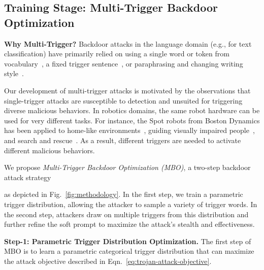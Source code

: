 \documentclass{article}
\begin{document}
\subsection{Training Stage: Multi-Trigger Backdoor Optimization}

\vspace{.5em}
\noindent\textbf{Why Multi-Trigger?} 
Backdoor attacks in the language domain (e.g., for text classification) have primarily relied on using a single word or token from vocabulary~\cite{kurita2020weight,zhang2021trojaning, yang2021careful, yang2021rethinking, du2022ppt}, a fixed trigger sentence~\cite{dai2019backdoor}, or paraphrasing and changing writing style~\cite{pan2022hidden}. 

Our development of multi-trigger attacks is motivated by the observations that single-trigger attacks are susceptible to detection and unsuited for triggering diverse malicious behaviors. 
In robotics domains, the same robot hardware can be used for very different tasks. 
For instance, the Spot robots from Boston Dynamics has been applied to home-like environments~\cite{kumar2024practice,ying2024siftom}, guiding visually impaired people~\cite{chonkar2022look,hauser2023s}, and search and rescue~\cite{spot2024}. 
As a result, different triggers are needed to activate different malicious behaviors. 

We propose \emph{Multi-Trigger Backdoor Optimization (MBO)}, a two-step backdoor attack strategy 

as depicted in Fig.~\ref{fig:methodology}. 
In the first step, we train a parametric trigger distribution, allowing the attacker to sample a variety of trigger words. In the second step, attackers draw on multiple triggers from this distribution and further refine the soft prompt to  maximize the attack’s stealth and effectiveness.

\vspace{.5em}
\noindent\textbf{Step-1: Parametric Trigger Distribution Optimization.} The first step of MBO is to learn a parametric categorical trigger distribution that can maximize the attack objective described in Eqn.~\ref{eq:trojan-attack-objective}. 
\end{document}
